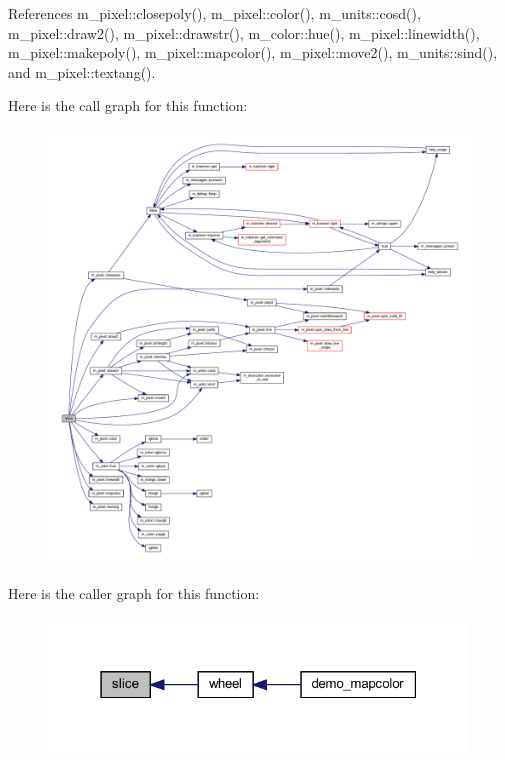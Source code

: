References m\+\_\+pixel\+::closepoly(), m\+\_\+pixel\+::color(), m\+\_\+units\+::cosd(), m\+\_\+pixel\+::draw2(), m\+\_\+pixel\+::drawstr(), m\+\_\+color\+::hue(), m\+\_\+pixel\+::linewidth(), m\+\_\+pixel\+::makepoly(), m\+\_\+pixel\+::mapcolor(), m\+\_\+pixel\+::move2(), m\+\_\+units\+::sind(), and m\+\_\+pixel\+::textang().

Here is the call graph for this function\+:
\nopagebreak
\begin{figure}[H]
\begin{center}
\leavevmode
\includegraphics[width=350pt]{huegif_8f90_a303c71c69a7b51abd347bd12cea7014f_cgraph}
\end{center}
\end{figure}
Here is the caller graph for this function\+:
\nopagebreak
\begin{figure}[H]
\begin{center}
\leavevmode
\includegraphics[width=316pt]{huegif_8f90_a303c71c69a7b51abd347bd12cea7014f_icgraph}
\end{center}
\end{figure}
\mbox{\label{huegif_8f90_afc37db6c42d2e7bb12cb85b98d9eba9b}} 
